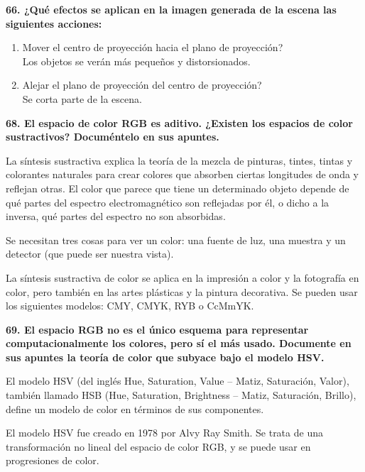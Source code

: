 \documentclass[a4paper, 11pt]{article}
\begin{document}
\textbf{66. ¿Qué efectos se aplican en la imagen generada de la escena las siguientes acciones:}
\begin{enumerate}
\item Mover el centro de proyección hacia el plano de proyección?\\
Los objetos se verán más pequeños y distorsionados.
\item Alejar el plano de proyección del centro de proyección?\\
Se corta parte de la escena.
\end{enumerate}

\textbf{68. El espacio de color RGB es aditivo. ¿Existen los espacios de color sustractivos? Documéntelo en sus apuntes.}

La síntesis sustractiva explica la teoría de la mezcla de pinturas, tintes, tintas y colorantes naturales para crear colores que absorben ciertas longitudes de onda y reflejan otras. El color que parece que tiene un determinado objeto depende de qué partes del espectro electromagnético son reflejadas por él, o dicho a la inversa, qué partes del espectro no son absorbidas.

Se necesitan tres cosas para ver un color: una fuente de luz, una muestra y un detector (que puede ser nuestra vista).

La síntesis sustractiva de color se aplica en la impresión a color y la fotografía en color, pero también en las artes plásticas y la pintura decorativa. Se pueden usar los siguientes modelos: 
CMY, CMYK, RYB o CcMmYK.

\textbf{69. El espacio RGB no es el único esquema para representar computacionalmente los colores, pero sí el más usado. Documente en sus apuntes la teoría de color que subyace bajo el modelo HSV.}

El modelo HSV (del inglés Hue, Saturation, Value – Matiz, Saturación, Valor), también llamado HSB (Hue, Saturation, Brightness – Matiz, Saturación, Brillo), define un modelo de color en términos de sus componentes. 

El modelo HSV fue creado en 1978 por Alvy Ray Smith. Se trata de una transformación no lineal del espacio de color RGB, y se puede usar en progresiones de color. 
\end{document}
